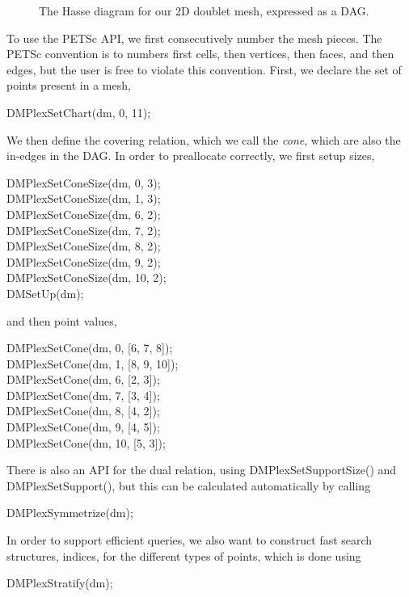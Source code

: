 {{{\begin{figure}
\caption{The Hasse diagram for our 2D doublet mesh, expressed as a DAG.}
\label{fig:doubletSieve}
\end{figure}
To use the PETSc API, we first consecutively number the mesh pieces. The PETSc convention is to numbers first cells,
then vertices, then faces, and then edges, but the user is free to violate this convention. First, we declare the set of
points present in a mesh,
\begin{tabbing}
  DMPlexSetChart(dm, 0, 11);
\end{tabbing}
We then define the covering relation, which we call the \textit{cone}, which are also the in-edges in the DAG. In order
to preallocate correctly, we first setup sizes,
\begin{tabbing}
  DMPlexSetConeSize(dm, 0, 3);\\
  DMPlexSetConeSize(dm, 1, 3);\\
  DMPlexSetConeSize(dm, 6, 2);\\
  DMPlexSetConeSize(dm, 7, 2);\\
  DMPlexSetConeSize(dm, 8, 2);\\
  DMPlexSetConeSize(dm, 9, 2);\\
  DMPlexSetConeSize(dm, 10, 2);\\
  DMSetUp(dm);
\end{tabbing}
and then point values,
\begin{tabbing}
  DMPlexSetCone(dm, 0, [6, 7, 8]);\\
  DMPlexSetCone(dm, 1, [8, 9, 10]);\\
  DMPlexSetCone(dm, 6, [2, 3]);\\
  DMPlexSetCone(dm, 7, [3, 4]);\\
  DMPlexSetCone(dm, 8, [4, 2]);\\
  DMPlexSetCone(dm, 9, [4, 5]);\\
  DMPlexSetCone(dm, 10, [5, 3]);
\end{tabbing}

There is also an API for the dual relation, using DMPlexSetSupportSize() and DMPlexSetSupport(), but this can be
calculated automatically by calling
\begin{tabbing}
  DMPlexSymmetrize(dm);
\end{tabbing}
In order to support efficient queries, we also want to construct fast search structures, indices, for the different
types of points, which is done using
\begin{tabbing}
  DMPlexStratify(dm);
\end{tabbing}

}}}
